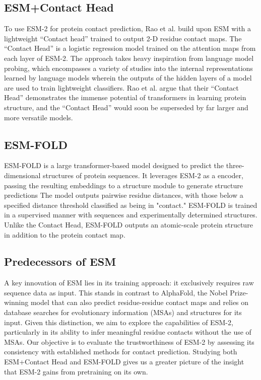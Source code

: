\documentclass{article}
\begin{document}
\subsection{ESM+Contact Head}

To use ESM-2 for protein contact prediction, Rao et al. build upon ESM with a lightweight ``Contact head'' trained to output 2-D residue contact maps. The ``Contact Head'' is a logistic regression model trained on the attention maps from each layer of ESM-2. The approach takes heavy inspiration from language model probing, which encompasses a variety of studies into the internal representations learned by language models wherein the outputs of the hidden layers of a model are used to train lightweight classifiers. Rao et al. argue that their ``Contact Head'' demonstrates the immense potential of transformers in learning protein structure, and the ``Contact Head'' would soon be superseded by far larger and more versatile models.

\subsection{ESM-FOLD}

ESM-FOLD \cite{ESM-FOLD} is a large transformer-based model designed to predict the three-dimensional structures of protein sequences. It leverages ESM-2 as a encoder, passing the resulting embeddings to a structure module to generate structure predictions The model outputs pairwise residue distances, with those below a specified distance threshold classified as being in "contact." ESM-FOLD is trained in a supervised manner with sequences and experimentally determined structures. Unlike the Contact Head, ESM-FOLD outputs an atomic-scale protein structure in addition to the protein contact map. 

\subsection{Predecessors of ESM}

A key innovation of ESM lies in its training approach: it exclusively requires raw sequence data as input. This stands in contrast to AlphaFold, the Nobel Prize-winning model that can also predict residue-residue contact maps and relies on database searches for evolutionary information (MSAs) and structures for its input. Given this distinction, we aim to explore the capabilities of ESM-2, particularly in its ability to infer meaningful residue contacts without the use of MSAs. Our objective is to evaluate the trustworthiness of ESM-2 by assessing its consistency with established methods for contact prediction. Studying both ESM+Contact Head and ESM-FOLD gives us a greater picture of the insight that ESM-2 gains from pretraining on its own. 
\end{document}
